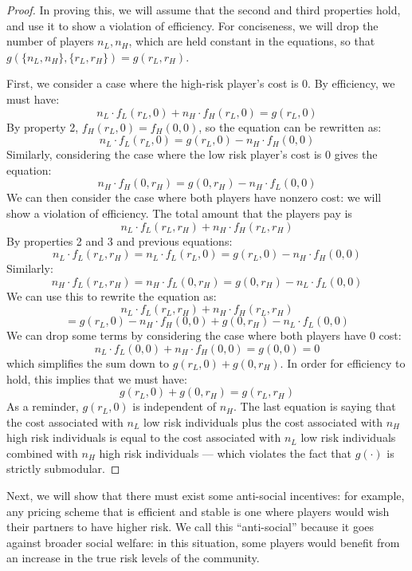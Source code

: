 \documentclass[sigconf]{acmart}
\newcommand{\nL}[0]{\ensuremath{n_L}}
\newcommand{\nH}[0]{\ensuremath{n_H}}
\newcommand{\rL}[0]{\ensuremath{r_L}}
\newcommand{\rH}[0]{\ensuremath{r_H}}
\newcommand{\cost}[0]{\ensuremath{g}}
\newcommand{\priceL}[0]{\ensuremath{f_L}}
\newcommand{\priceH}[0]{\ensuremath{f_H}}
\newcommand{\cd}[0]{\cdot}
\begin{document}
\begin{proof}
In proving this, we will assume that the second and third properties hold, and use it to show a violation of efficiency. For conciseness, we will drop the number of players $\nL, \nH$, which are held constant in the equations, so that $\cost(\{\nL, \nH\}, \{\rL, \rH\}) = \cost(\rL, \rH) $. 

First, we consider a case where the high-risk player's cost is 0. By efficiency, we must have: 
$$\nL \cd \priceL(\rL, 0) + \nH \cd\priceH(\rL, 0)  = \cost(\rL, 0)$$ 
By property 2, $\priceH(\rL, 0) = \priceH(0, 0)$, so the equation can be rewritten as: 
$$\nL \cd \priceL(\rL, 0)  =  \cost(\rL, 0)- \nH \cd\priceH(0, 0)$$ 
Similarly, considering the case where the low risk player's cost is 0 gives the equation: 
$$\nH \cd \priceH(0, \rH)  =  \cost(0, \rH)- \nH \cd\priceL(0, 0)$$ 
We can then consider the case where both players have nonzero cost: we will show a violation of efficiency. The total amount that the players pay is
$$\nL \cd \priceL(\rL, \rH) + \nH \cd\priceH(\rL, \rH)$$
By properties 2 and 3 and previous equations: 
$$\nL \cd \priceL(\rL, \rH) = \nL \cd \priceL(\rL, 0) =\cost(\rL, 0)- \nH \cd\priceH(0, 0)$$
Similarly: 
$$\nH \cd \priceL(\rL, \rH) = \nH \cd \priceL(0, \rH) =\cost(0, \rH)- \nL \cd\priceL(0, 0)$$
We can use this to rewrite the equation as: 
$$\nL \cd \priceL(\rL, \rH) + \nH \cd\priceH(\rL, \rH)$$
$$ =\cost(\rL, 0)- \nH \cd\priceH(0, 0)+ \cost(0, \rH)- \nL \cd\priceL(0, 0)$$
We can drop some terms by considering the case where both players have 0 cost: 
$$\nL \cd \priceL(0, 0) + \nH \cd\priceH(0, 0)  = \cost(0, 0) = 0$$
which simplifies the sum down to $\cost(\rL, 0)+ \cost(0, \rH)$. 
In order for efficiency to hold, this implies that we must have:
$$ \cost(\rL, 0)+ \cost(0, \rH) = \cost(\rL, \rH)$$
As a reminder, $\cost(\rL,0)$ is independent of $\nH$. 
The last equation is saying that the cost associated with $\nL$ low risk individuals plus the cost associated with $\nH$ high risk individuals is equal to the cost associated with $\nL$ low risk individuals combined with $\nH$ high risk individuals --- which violates the fact that $\cost(\cd)$ is strictly submodular. 
\end{proof}


Next, we will show that there must exist some anti-social incentives: for example, any pricing scheme that is efficient and stable is one where players would wish their partners to have higher risk. We call this \enquote{anti-social} because it goes against broader social welfare: in this situation, some players would benefit from an increase in the true risk levels of the community.
\end{document}
